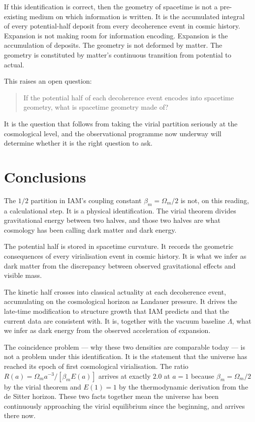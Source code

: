If this identification is correct, then the geometry of spacetime is not a pre-existing medium on which information is written. It is the accumulated
integral of every potential-half deposit from every decoherence event in cosmic history. Expansion is not making room for information encoding. Expansion is
the accumulation of deposits. The geometry is not deformed by matter. The geometry is constituted by matter's continuous transition from potential to actual.

This raises an open question:
\begin{quote}
If the potential half of each decoherence event encodes into spacetime geometry, what is spacetime geometry made of?
\end{quote}
It is the question that follows from taking the virial partition seriously at the cosmological level, and the
observational programme now underway will determine whether it is the right question to ask.

\section{Conclusions}\label{sec:vp_conclusions}
The $1/2$ partition in IAM's coupling constant $\beta_m=\Omega_m/2$ is not, on this reading, a calculational step. It is a physical identification. The
virial theorem divides gravitational energy between two halves, and those two halves are what cosmology has been calling dark matter and dark energy.
\conjecture

The potential half is stored in spacetime curvature. It records the geometric consequences of every virialisation event in cosmic history. It is what we
infer as dark matter from the discrepancy between observed gravitational effects and visible mass.

The kinetic half crosses into classical actuality at each decoherence event, accumulating on the cosmological horizon as Landauer pressure. It drives the
late-time modification to structure growth that IAM predicts and that the current data are consistent with. It is, together with the vacuum baseline
$\Lambda$, what we infer as dark energy from the observed acceleration of expansion.

The coincidence problem --- why these two densities are comparable today --- is not a problem under this identification. It is the statement that the
universe has reached its epoch of first cosmological virialisation. The ratio $R(a)=\Omega_ma^{-3}/[\beta_mE(a)]$ arrives at exactly $2.0$ at $a=1$ because
$\beta_m=\Omega_m/2$ by the virial theorem and $E(1)=1$ by the thermodynamic derivation from the de Sitter horizon. These two facts together mean the
universe has been continuously approaching the virial equilibrium since the beginning, and arrives there now. \interp

